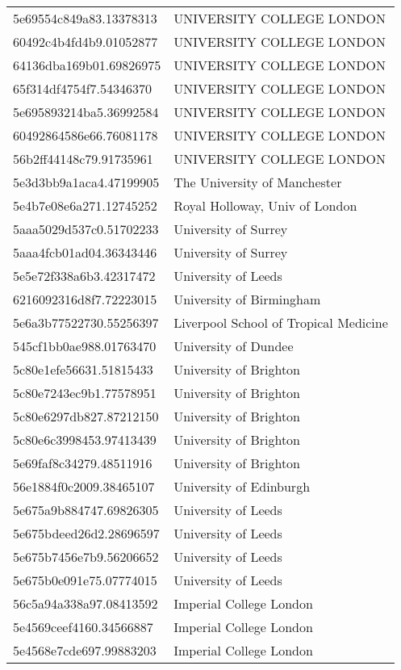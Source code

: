 \begin{tabular}{ll}
5e69554c849a83.13378313 & UNIVERSITY COLLEGE LONDON \\
60492c4b4fd4b9.01052877 & UNIVERSITY COLLEGE LONDON \\
64136dba169b01.69826975 & UNIVERSITY COLLEGE LONDON \\
65f314df4754f7.54346370 & UNIVERSITY COLLEGE LONDON \\
5e695893214ba5.36992584 & UNIVERSITY COLLEGE LONDON \\
60492864586e66.76081178 & UNIVERSITY COLLEGE LONDON \\
56b2ff44148c79.91735961 & UNIVERSITY COLLEGE LONDON \\
5e3d3bb9a1aca4.47199905 & The University of Manchester \\
5e4b7e08e6a271.12745252 & Royal Holloway, Univ of London \\
5aaa5029d537c0.51702233 & University of Surrey \\
5aaa4fcb01ad04.36343446 & University of Surrey \\
5e5e72f338a6b3.42317472 & University of Leeds \\
6216092316d8f7.72223015 & University of Birmingham \\
5e6a3b77522730.55256397 & Liverpool School of Tropical Medicine \\
545cf1bb0ae988.01763470 & University of Dundee \\
5c80e1efe56631.51815433 & University of Brighton \\
5c80e7243ec9b1.77578951 & University of Brighton \\
5c80e6297db827.87212150 & University of Brighton \\
5c80e6c3998453.97413439 & University of Brighton \\
5e69faf8c34279.48511916 & University of Brighton \\
56e1884f0c2009.38465107 & University of Edinburgh \\
5e675a9b884747.69826305 & University of Leeds \\
5e675bdeed26d2.28696597 & University of Leeds \\
5e675b7456e7b9.56206652 & University of Leeds \\
5e675b0e091e75.07774015 & University of Leeds \\
56c5a94a338a97.08413592 & Imperial College London \\
5e4569ceef4160.34566887 & Imperial College London \\
5e4568e7cde697.99883203 & Imperial College London \\

\end{tabular}
